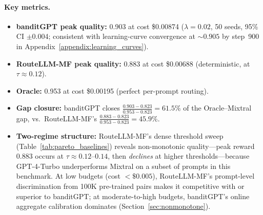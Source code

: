 \paragraph{Key metrics.}
\begin{itemize}[leftmargin=*,noitemsep]
    \item \textbf{banditGPT peak quality:} 0.903 at cost \$0.00874
          ($\lambda{=}0.02$, 50 seeds, 95\% CI $\pm$0.004;
          consistent with learning-curve convergence at ${\sim}0.905$ by
          step~900 in Appendix~\ref{appendix:learning_curves}).
    \item \textbf{RouteLLM-MF peak quality:} 0.883 at cost \$0.00688
          (deterministic, at $\tau{\approx}0.12$).
    \item \textbf{Oracle:} 0.953 at cost \$0.00195 (perfect per-prompt routing).
    \item \textbf{Gap closure:} banditGPT closes
          $\frac{0.903 - 0.823}{0.953 - 0.823} = 61.5\%$ of the
          Oracle--Mixtral gap, vs.\ RouteLLM-MF's
          $\frac{0.883 - 0.823}{0.953 - 0.823} = 45.9\%$.
    \item \textbf{Two-regime structure:}
          RouteLLM-MF's dense threshold sweep
          (Table~\ref{tab:pareto_baselines}) reveals non-monotonic
          quality---peak reward 0.883 occurs at $\tau{\approx}0.12$--$0.14$,
          then \emph{declines} at higher thresholds---because GPT-4-Turbo
          underperforms Mixtral on a subset of prompts in this benchmark.
          At low budgets (cost $< \$0.005$), RouteLLM-MF's prompt-level
          discrimination from 100K pre-trained pairs makes it competitive
          with or superior to banditGPT; at moderate-to-high budgets,
          banditGPT's online aggregate calibration dominates
          (Section~\ref{sec:nonmonotone}).
\end{itemize}
